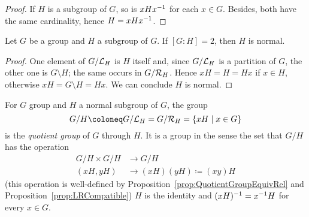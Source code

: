 \begin{proof}
If \(H\) is a subgroup of \(G\), so is \(x H x^{-1}\) for each \(x \in G\). Besides, both have the same cardinality, hence \(H = xHx^{-1}\).
\end{proof}

\begin{corollary}
Let \(G\) be a group and \(H\) a subgroup of \(G\). If \([G:H] = 2\), then \(H\) is normal.
\end{corollary}

\begin{proof}
One element of \(G/\mathcal L_H\) is \(H\) itself and, since \(G/\mathcal L_H\) is a partition of \(G\), the other one is \(G \setminus H\); the same occurs in \(G/\mathcal R_H\). Hence \(xH = H = Hx\) if \(x \in H\), otherwise \(xH = G \setminus H = Hx\). We can conclude \(H\) is normal.
\end{proof}

\begin{definition}
For \(G\) group and \(H\) a normal subgroup of \(G\), the group
\[G/H \coloneq G/\call_H = G/\calr_H = \set{xH \mid x \in G}\]
is the {\em quotient group} of \(G\) through \(H\). It is a group in the sense the set that \(G/H\) has the operation
\begin{align*}
G/H \times G/H & \to G/H \\
(xH, yH) & \to (xH)(yH) \coloneq (xy)H
\end{align*}
(this operation is well-defined by Proposition~\ref{prop:QuotientGroupEquivRel} and Proposition~\ref{prop:LRCompatible}) \(H\) is the identity and \((xH)^{-1} = x^{-1} H\) for every \(x \in G\).
\end{definition}



